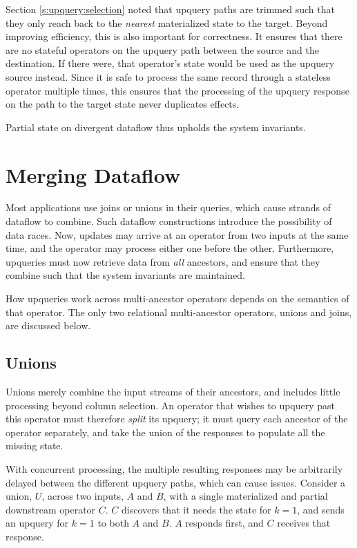 Section \ref{s:upquery:selection} noted that upquery paths are trimmed such that
they only reach back to the \emph{nearest} materialized state to the target.
Beyond improving efficiency, this is also important for correctness. It ensures
that there are no stateful operators on the upquery path between the source and
the destination. If there were, that operator's state would be used as the
upquery source instead. Since it is safe to process the same record through a
stateless operator multiple times, this ensures that the processing of the
upquery response on the path to the target state never duplicates effects.

Partial state on divergent dataflow thus upholds the system invariants.

\section{Merging Dataflow}
\label{s:partial:merging}

Most applications use joins or unions in their queries, which cause strands of
dataflow to combine. Such dataflow constructions introduce the possibility of
data races. Now, updates may arrive at an operator from two inputs at the same
time, and the operator may process either one before the other. Furthermore,
upqueries must now retrieve data from \emph{all} ancestors, and ensure that they
combine such that the system invariants are maintained.

How upqueries work across multi-ancestor operators depends on the semantics of
that operator. The only two relational multi-ancestor operators, unions and
joins, are discussed below.

\subsection{Unions}
\label{s:upqueries:union}

Unions merely combine the input streams of their ancestors, and includes little
processing beyond column selection. An operator that wishes to upquery past this
operator must therefore \emph{split} its upquery; it must query each ancestor of
the operator separately, and take the union of the responses to populate all the
missing state.

With concurrent processing, the multiple resulting responses may be arbitrarily
delayed between the different upquery paths, which can cause issues. Consider a
union, $U$, across two inputs, $A$ and $B$, with a single materialized and
partial downstream operator $C$. $C$ discovers that it needs the state for $k =
1$, and sends an upquery for $k = 1$ to both $A$ and $B$. $A$ responds first,
and $C$ receives that response.

